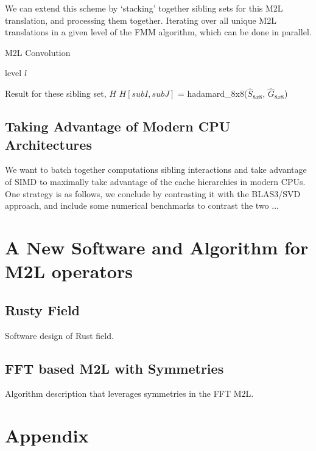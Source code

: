 \documentclass[12pt, a4, twoside]{article}
\begin{document}
We can extend this scheme by `stacking' together sibling sets for this M2L translation, and processing them together. Iterating over all unique M2L translations in a given level of the FMM algorithm, which can be done in parallel.

\begin{algorithm}
    \caption{M2L Convolution}
        \begin{algorithmic}[1]
            \Require level $l$ 
                \parState
                
                \State Result for these sibling set, $H$
                    \State $H[subI, subJ]$ = hadamard\_8x8($\hat{S}_{8x8}$, $\hat{G}_{8x8}$)
                \EndFor
            \EndFor
    \end{algorithmic}
\end{algorithm}
    

\subsection{Taking Advantage of Modern CPU Architectures}

We want to batch together computations sibling interactions and take advantage of SIMD to maximally take advantage of the cache hierarchies in modern CPUs. One strategy is as follows, we conclude by contrasting it with the BLAS3/SVD approach, and include some numerical benchmarks to contrast the two ...


\section{A New Software and Algorithm for M2L operators}

\subsection{Rusty Field}

Software design of Rust field.


\subsection{FFT based M2L with Symmetries}

Algorithm description that leverages symmetries in the FFT M2L.

\section{Appendix}
\end{document}
